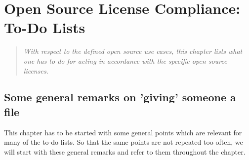 %
%
%
%
%


\chapter{Open Source License Compliance: To-Do Lists}

\footnotesize
\begin{quote}\itshape
With respect to the defined open source use cases, this chapter lists what one
has to do for acting in accordance with the specific open source licenses.
\end{quote}
\normalsize{}

\section{Some general remarks on 'giving' someone a file}

This chapter has to be started with some general points which are relevant for
many of the to-do lists. So that the same points are not repeated too often, we
will start with these general remarks and refer to them throughout the chapter.

